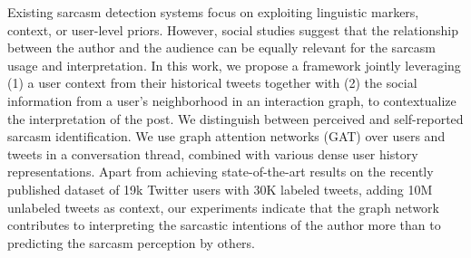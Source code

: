 Existing sarcasm detection systems focus on exploiting linguistic markers, context, or user-level priors. However, social studies suggest that the relationship between the author and the audience can be equally relevant for the sarcasm usage and interpretation. In this work, we propose a framework jointly leveraging (1) a user context from their historical tweets together with (2) the social information from a user's neighborhood in an interaction graph, to contextualize the interpretation of the post. We distinguish between perceived and self-reported sarcasm identification. We use graph attention networks (GAT) over users and tweets in a conversation thread, combined with various dense user history representations. Apart from achieving state-of-the-art results on the recently published dataset of 19k Twitter users with 30K labeled tweets, adding 10M unlabeled tweets as context, our experiments indicate that the graph network contributes to interpreting the sarcastic intentions of the author more than to predicting the sarcasm perception by others.

